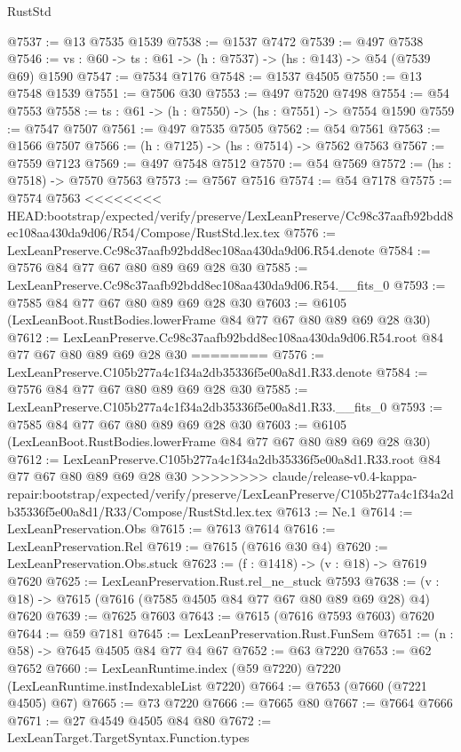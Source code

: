 \begin{lexlean}{RustStd}
\begin{coremodule}
{\begin{coremodule}
{{{{{{{{{{{{@7537 := @13 @7535 @1539
@7538 := @1537 @7472
@7539 := @497 @7538
@7546 := {vs : @60} -> {ts : @61} -> (h : @7537) -> (hs : @143) -> @54 (@7539 @69) @1590
@7547 := @7534 @7176
@7548 := @1537 @4505
@7550 := @13 @7548 @1539
@7551 := @7506 @30
@7553 := @497 @7520 @7498
@7554 := @54 @7553
@7558 := {ts : @61} -> (h : @7550) -> (hs : @7551) -> @7554 @1590
@7559 := @7547 @7507
@7561 := @497 @7535 @7505
@7562 := @54 @7561
@7563 := @1566 @7507
@7566 := (h : @7125) -> (hs : @7514) -> @7562 @7563
@7567 := @7559 @7123
@7569 := @497 @7548 @7512
@7570 := @54 @7569
@7572 := (hs : @7518) -> @7570 @7563
@7573 := @7567 @7516
@7574 := @54 @7178
@7575 := @7574 @7563
<<<<<<<< HEAD:bootstrap/expected/verify/preserve/LexLeanPreserve/Cc98c37aafb92bdd8ec108aa430da9d06/R54/Compose/RustStd.lex.tex
@7576 := LexLeanPreserve.Cc98c37aafb92bdd8ec108aa430da9d06.R54.denote
@7584 := @7576 @84 @77 @67 @80 @89 @69 @28 @30
@7585 := LexLeanPreserve.Cc98c37aafb92bdd8ec108aa430da9d06.R54.__fits_0
@7593 := @7585 @84 @77 @67 @80 @89 @69 @28 @30
@7603 := @6105 (LexLeanBoot.RustBodies.lowerFrame @84 @77 @67 @80 @89 @69 @28 @30)
@7612 := LexLeanPreserve.Cc98c37aafb92bdd8ec108aa430da9d06.R54.root @84 @77 @67 @80 @89 @69 @28 @30
========
@7576 := LexLeanPreserve.C105b277a4c1f34a2db35336f5e00a8d1.R33.denote
@7584 := @7576 @84 @77 @67 @80 @89 @69 @28 @30
@7585 := LexLeanPreserve.C105b277a4c1f34a2db35336f5e00a8d1.R33.__fits_0
@7593 := @7585 @84 @77 @67 @80 @89 @69 @28 @30
@7603 := @6105 (LexLeanBoot.RustBodies.lowerFrame @84 @77 @67 @80 @89 @69 @28 @30)
@7612 := LexLeanPreserve.C105b277a4c1f34a2db35336f5e00a8d1.R33.root @84 @77 @67 @80 @89 @69 @28 @30
>>>>>>>> claude/release-v0.4-kappa-repair:bootstrap/expected/verify/preserve/LexLeanPreserve/C105b277a4c1f34a2db35336f5e00a8d1/R33/Compose/RustStd.lex.tex
@7613 := Ne.{1}
@7614 := LexLeanPreservation.Obs
@7615 := @7613 @7614
@7616 := LexLeanPreservation.Rel
@7619 := @7615 (@7616 @30 @4)
@7620 := LexLeanPreservation.Obs.stuck
@7623 := (f : @1418) -> (v : @18) -> @7619 @7620
@7625 := LexLeanPreservation.Rust.rel_ne_stuck @7593
@7638 := (v : @18) -> @7615 (@7616 (@7585 @4505 @84 @77 @67 @80 @89 @69 @28) @4) @7620
@7639 := @7625 @7603
@7643 := @7615 (@7616 @7593 @7603) @7620
@7644 := @59 @7181
@7645 := LexLeanPreservation.Rust.FunSem
@7651 := (n : @58) -> @7645 @4505 @84 @77 @4 @67
@7652 := @63 @7220
@7653 := @62 @7652
@7660 := LexLeanRuntime.index (@59 @7220) @7220 (LexLeanRuntime.instIndexableList @7220)
@7664 := @7653 (@7660 (@7221 @4505) @67)
@7665 := @73 @7220
@7666 := @7665 @80
@7667 := @7664 @7666
@7671 := @27 @4549 @4505 @84 @80
@7672 := LexLeanTarget.TargetSyntax.Function.types
}}}}}}}}}}}}
\end{coremodule}}
\end{coremodule}
\end{lexlean}
